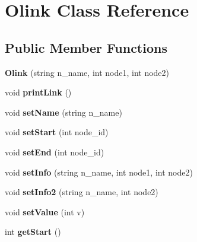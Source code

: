 \hypertarget{classOlink}{\section{\-Olink \-Class \-Reference}
\label{classOlink}
}
\subsection*{\-Public \-Member \-Functions}
\begin{DoxyCompactItemize}
\item 
\hypertarget{classOlink_a28207a8f35005dde40183562720279b4}{{\bfseries \-Olink} (string n\-\_\-name, int node1, int node2)}\label{classOlink_a28207a8f35005dde40183562720279b4}

\item 
\hypertarget{classOlink_a319a267cc33e64887d3d7d59d9066729}{void {\bfseries print\-Link} ()}\label{classOlink_a319a267cc33e64887d3d7d59d9066729}

\item 
\hypertarget{classOlink_a58aeb3f7197b9d959b38a685299da730}{void {\bfseries set\-Name} (string n\-\_\-name)}\label{classOlink_a58aeb3f7197b9d959b38a685299da730}

\item 
\hypertarget{classOlink_aedc55c8e80c3368727574e78f07a6491}{void {\bfseries set\-Start} (int node\-\_\-id)}\label{classOlink_aedc55c8e80c3368727574e78f07a6491}

\item 
\hypertarget{classOlink_abd0f782549992220831c12d43930fd7b}{void {\bfseries set\-End} (int node\-\_\-id)}\label{classOlink_abd0f782549992220831c12d43930fd7b}

\item 
\hypertarget{classOlink_adf5647d22ab7e3695d575221f7ac6545}{void {\bfseries set\-Info} (string n\-\_\-name, int node1, int node2)}\label{classOlink_adf5647d22ab7e3695d575221f7ac6545}

\item 
\hypertarget{classOlink_a0d2fa9aa2cd8c45cd2061bb0bac5e0bb}{void {\bfseries set\-Info2} (string n\-\_\-name, int node2)}\label{classOlink_a0d2fa9aa2cd8c45cd2061bb0bac5e0bb}

\item 
\hypertarget{classOlink_a5f860c8008b4600d96c79c0b7da0cc28}{void {\bfseries set\-Value} (int v)}\label{classOlink_a5f860c8008b4600d96c79c0b7da0cc28}

\item 
\hypertarget{classOlink_a936c57121ac209bec1ec71e22d02eba4}{int {\bfseries get\-Start} ()}\label{classOlink_a936c57121ac209bec1ec71e22d02eba4}


\end{DoxyCompactItemize}
